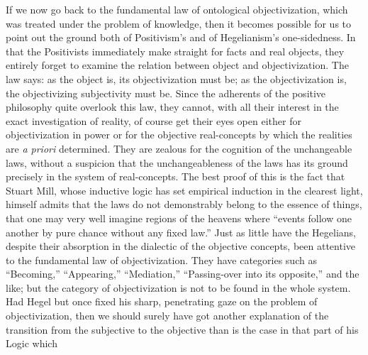 \documentclass[12pt]{article}
\begin{document}
If we now go back to the fundamental law of ontological objectivization,
which was treated under the problem of knowledge, then it becomes possible
for us to point out the ground both of Positivism's
and of Hegelianism's one-sidedness. In that the Positivists immediately make
straight for facts and real objects, they entirely forget to examine the
relation between object and objectivization. The law says: as the object is,
its objectivization must be; as the objectivization is, the objectivizing
subjectivity must be. Since the adherents of the positive philosophy quite
overlook this law, they cannot, with all their interest in the exact
investigation of reality, of course get their eyes open either for
objectivization in power or for the objective real-concepts by which the
realities are \textit{a priori} determined. They are zealous for the
cognition of the unchangeable laws, without a suspicion that the
unchangeableness of the laws has its ground precisely in the system of
real-concepts. The best proof of this is the fact that Stuart Mill, whose
inductive logic has set empirical induction in the clearest light, himself
admits that the laws do not demonstrably belong to the essence of things,
that one may very well imagine regions of the heavens where ``events follow
one another by pure chance without any fixed law.'' Just as little have the
Hegelians, despite their absorption in the dialectic of the objective
concepts, been attentive to the fundamental law of objectivization. They
have categories such as ``Becoming,'' ``Appearing,'' ``Mediation,''
``Passing-over into its opposite,'' and the like; but the category of
objectivization is not to be found in the whole system. Had Hegel but once
fixed his sharp, penetrating gaze on the problem of objectivization, then we
should surely have got another explanation of the transition from the
subjective to the objective than is the case in that part of his Logic which
\end{document}
